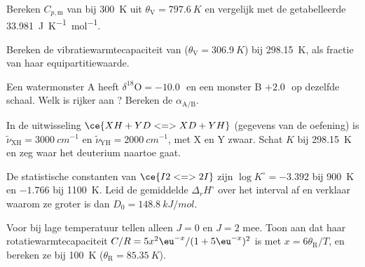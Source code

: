 \begin{exercise}[$\star\star$]\label{exo:b3:statistical-thermo-applied:7}
Bereken $C_{p,\mathrm m}$ van  bij \qty{300}{K} uit $\theta_{\mathrm V} = \qty{797.6}{K}$ en vergelijk met de
getabelleerde \qty{33.981}{J.K^{-1}.mol^{-1}}.
\end{exercise}

\begin{exercise}[$\star\star$]\label{exo:b3:statistical-thermo-applied:8}
Bereken de vibratiewarmtecapaciteit van  ($\theta_{\mathrm V} = \qty{306.9}{K}$) bij
\qty{298.15}{K}, als fractie van haar equipartitiewaarde.
\end{exercise}

\begin{exercise}[$\star\star$]\label{exo:b3:statistical-thermo-applied:9}
Een watermonster A heeft $\delta^{18}\mathrm O = -10.0$\,\textperthousand\ en een monster B
$+2.0$\,\textperthousand\ op dezelfde schaal. Welk is rijker aan ?
Bereken de  $\alpha_{\mathrm{A/B}}$.
\end{exercise}

\begin{exercise}[$\star\star\star$]\label{exo:b3:statistical-thermo-applied:10}
In de uitwisseling $\ce{XH + YD <=> XD + YH}$ (gegevens van de oefening) is $\tilde\nu_{\mathrm{XH}} =
\qty{3000}{cm^{-1}}$ en $\tilde\nu_{\mathrm{YH}} = \qty{2000}{cm^{-1}}$, met X en Y zwaar. Schat $K$ bij
\qty{298.15}{K} en zeg waar het deuterium naartoe gaat.
\end{exercise}

\begin{exercise}[$\star\star\star$]\label{exo:b3:statistical-thermo-applied:11}
De statistische constanten van $\ce{I2 <=> 2 I}$ zijn $\log K^\circ = -3.392$ bij \qty{900}{K} en
$-1.766$ bij \qty{1100}{K}. Leid de gemiddelde $\Delta_rH^\circ$ over het
interval af en verklaar waarom ze groter is dan $D_0 = \qty{148.8}{kJ/mol}$.
\end{exercise}

\begin{exercise}[$\star\star\star$]\label{exo:b3:statistical-thermo-applied:12}
Voor  bij lage temperatuur tellen alleen $J = 0$ en $J = 2$
mee. Toon aan dat haar rotatiewarmtecapaciteit $C/R = 5x^2\eu^{-x}/(1 + 5\eu^{-x})^2$ is met $x = 6\theta_{\mathrm R}/T$, en
bereken ze bij \qty{100}{K} ($\theta_{\mathrm R} = \qty{85.35}{K}$).
\end{exercise}

